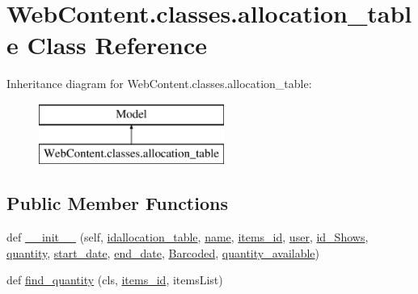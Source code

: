 \hypertarget{class_web_content_1_1classes_1_1allocation__table}{}\section{Web\+Content.\+classes.\+allocation\+\_\+table Class Reference}
\label{class_web_content_1_1classes_1_1allocation__table}
Inheritance diagram for Web\+Content.\+classes.\+allocation\+\_\+table\+:\begin{figure}[H]
\begin{center}
\leavevmode
\includegraphics[height=2.000000cm]{class_web_content_1_1classes_1_1allocation__table}
\end{center}
\end{figure}
\subsection*{Public Member Functions}
\begin{DoxyCompactItemize}
\item 
def \hyperlink{class_web_content_1_1classes_1_1allocation__table_a1eecb55816c97b0cb5e07a170289695b}{\+\_\+\+\_\+init\+\_\+\+\_\+} (self, \hyperlink{class_web_content_1_1classes_1_1allocation__table_aa3e71cab5ccef034cc859f9df77b83cb}{idallocation\+\_\+table}, \hyperlink{class_web_content_1_1classes_1_1allocation__table_a22afd1f2474fcb3a8add213aa82f08b9}{name}, \hyperlink{class_web_content_1_1classes_1_1allocation__table_ad98336114a772790e5c148f397de445c}{items\+\_\+id}, \hyperlink{class_web_content_1_1classes_1_1allocation__table_a42be6ad06e7d48d95d6f792d42e44ff6}{user}, \hyperlink{class_web_content_1_1classes_1_1allocation__table_a2e89ec86c3716d18e305c9c259f86eca}{id\+\_\+\+Shows}, \hyperlink{class_web_content_1_1classes_1_1allocation__table_a18854e8abdc8f618ce03cfbfbb0932e8}{quantity}, \hyperlink{class_web_content_1_1classes_1_1allocation__table_a5144b48dae04c952fa2a83701424dee5}{start\+\_\+date}, \hyperlink{class_web_content_1_1classes_1_1allocation__table_a7e1a1a4c7faa7f0af957407a80becd67}{end\+\_\+date}, \hyperlink{class_web_content_1_1classes_1_1allocation__table_a03a6731faa9d3420c8c018cdefbddbb8}{Barcoded}, \hyperlink{class_web_content_1_1classes_1_1allocation__table_a3f9c6c91b93e0802e156df425ba39eba}{quantity\+\_\+available})
\item 
def \hyperlink{class_web_content_1_1classes_1_1allocation__table_ad9d19b4d3ee1752e1d450e50eb34e117}{find\+\_\+quantity} (cls, \hyperlink{class_web_content_1_1classes_1_1allocation__table_ad98336114a772790e5c148f397de445c}{items\+\_\+id}, items\+List)
\end{DoxyCompactItemize}
